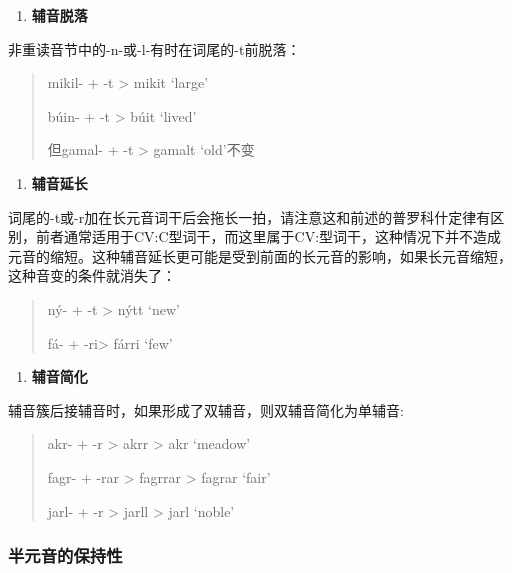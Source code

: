 \begin{enumerate}
  \def\labelenumi{\Alph{enumi}.}
  \setcounter{enumi}{2}
  \item
        \textbf{辅音脱落}
\end{enumerate}

非重读音节中的-n-或-l-有时在词尾的-t前脱落：

\begin{quote}
  mikil- + -t \textgreater{} mikit `large'

  búin- + -t \textgreater{} búit `lived'

  但gamal- + -t \textgreater{} gamalt `old'不变
\end{quote}

\begin{enumerate}
  \def\labelenumi{\Alph{enumi}.}
  \setcounter{enumi}{3}
  \item
        \label{_Ref116211616}{}\textbf{辅音延长}
\end{enumerate}

词尾的-t或-r加在长元音词干后会拖长一拍，请注意这和前述的普罗科什定律有区别，前者通常适用于CV:C型词干，而这里属于CV:型词干，这种情况下并不造成元音的缩短。这种辅音延长更可能是受到前面的长元音的影响，如果长元音缩短，这种音变的条件就消失了：

\begin{quote}
  ný- + -t \textgreater{} nýtt `new'

  fá- + -ri\textgreater{} fárri `few'
\end{quote}

\begin{enumerate}
  \def\labelenumi{\Alph{enumi}.}
  \setcounter{enumi}{4}
  \item
        \label{_Ref115765758}{}\textbf{辅音简化}
\end{enumerate}

辅音簇后接辅音时，如果形成了双辅音，则双辅音简化为单辅音:

\begin{quote}
  akr- + -r \textgreater{} akrr \textgreater{} akr `meadow'

  fagr- + -rar \textgreater{} fagrrar \textgreater{} fagrar `fair'

  jarl- + -r \textgreater{} jarll \textgreater{} jarl `noble'
\end{quote}

\subsubsection{半元音的保持性}\label{半元音的保持性}

